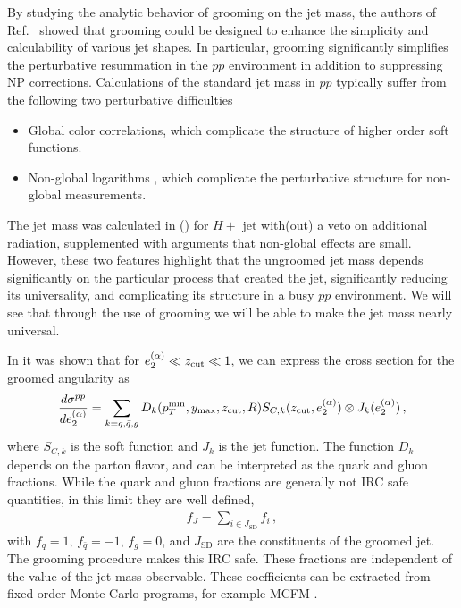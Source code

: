 By studying the analytic behavior of grooming on the jet mass, the authors of Ref.~\cite{Dasgupta:2013ihk} showed that grooming could be designed to enhance the simplicity and calculability of various jet shapes.  In particular, grooming significantly simplifies the perturbative resummation in the $pp$ environment in addition to suppressing NP corrections.  Calculations of the standard jet mass in $pp$ typically suffer from the following two perturbative difficulties
\begin{itemize}
\item Global color correlations, which complicate the structure of higher order soft functions.
\item Non-global logarithms \cite{Dasgupta:2001sh}, which complicate the perturbative structure for non-global measurements.
\end{itemize}
The jet mass was calculated in \cite{Jouttenus:2013hs} (\cite{arXiv:1207.1640}) for $H+$ jet with(out) a
veto on additional radiation, supplemented with arguments that
non-global effects are small. However, these two features highlight
that the ungroomed jet mass depends significantly on the particular
process that created the jet, significantly reducing its universality,
and complicating its structure in a busy $pp$ environment. We will see
that through the use of grooming we will be able to make the jet mass
nearly universal.


In  it was shown that for $e_{2}^{(\alpha)} \ll z_{\rm cut} \ll 1$,  we can express the cross section for the groomed angularity as
\begin{align}\label{eq:fac_pp_e2}
\frac{d\sigma^{pp}}{de_{2}^{(\alpha)}}=\sum\limits_{k=q,\bar q, g}D_k(p_T^{\text{min}}, y_\text{max}, z_{\rm cut}, R) S_{C,k}(z_{\rm cut}, e_{2}^{(\alpha)})\otimes J_k (e_{2}^{(\alpha)})\,,
\end{align}
\noindent where $S_{C,k}$ is the soft function and $J_k$ is the jet function.  The function $D_k$ depends on the parton flavor, and can be interpreted as the quark and gluon fractions. While the quark and gluon fractions are generally not IRC safe quantities, in this limit they are well defined, 
\begin{align}
f_J=\sum\limits_{i\in J_{\text{SD}}} f_i\,,
\end{align}
with $f_q=1$, $f_{\bar q}=-1$, $f_g=0$, and $J_{\text{SD}}$ are the constituents of the groomed jet. The grooming procedure makes this IRC safe. These fractions are independent of the value of the jet mass observable. These coefficients can be extracted from fixed order Monte Carlo programs, for example MCFM \cite{Campbell:1999ah,Campbell:2010ff,Campbell:2011bn}.



